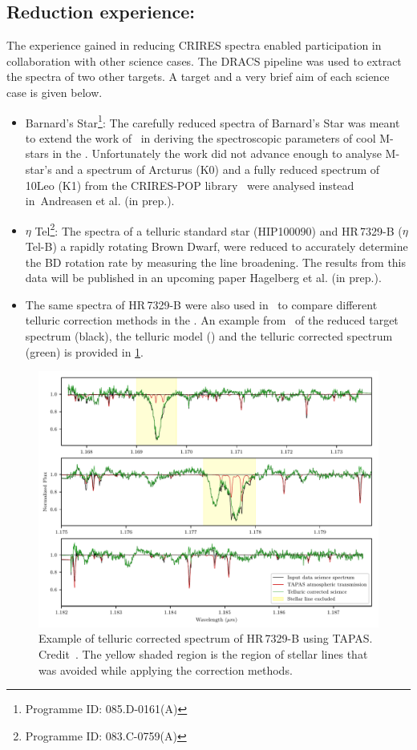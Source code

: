 \subsection{Reduction experience:}
\label{subsec:experience}
The experience gained in reducing {CRIRES} spectra enabled participation in collaboration with other science cases.
The {DRACS} pipeline was used to extract the spectra of two other targets.
A target and a very brief aim of each science case is given below.
\begin{itemize}
\item Barnard's Star\footnote{Programme {{ID}}: 085.D-0161(A)}: The carefully reduced \nir{} spectra of Barnard's Star was meant to extend the work of~\citet{andreasen_nearinfrared_2016} in deriving the spectroscopic parameters of cool M-stars in the \nir{}.
Unfortunately the work did not advance enough to analyse M-star's and a spectrum of {Arcturus} (K0) and a fully reduced spectrum of {10Leo} (K1) from the {CRIRES}-POP library~\cite{nicholls_crirespop_2017} were analysed instead in~{Andreasen et al. (in prep.)}.
\item \(\eta\) Tel\footnote{Programme {{ID}}: 083.C-0759(A)}: The spectra of a telluric standard star (HIP100090) and {HR\,7329-B} (\(\eta\) Tel-B) a rapidly rotating Brown Dwarf, were reduced to accurately determine the BD rotation rate by measuring the line broadening.
The results from this data will be published in an upcoming paper Hagelberg et al. (in prep.).
\item The same spectra of {HR\,7329-B} were also used in~\citet{ulmer-moll_telluric_2018} to compare different telluric correction methods in the \nir{}.
An example from~\citet[][(B.3)]{ulmer-moll_telluric_2018} of the reduced target spectrum (black), the telluric model () and the telluric corrected spectrum (green) is provided in \cref{fig:ulmermol2018tellcorrcrires48}.
\end{itemize}

\begin{figure}
    \centering
    \includegraphics[width=0.7\linewidth]{figures/reduction/ulmermol2018_tell_corr_CRIRES_48}
    \caption{Example of telluric corrected spectrum of {HR\,7329-B} using {TAPAS}.
Credit~\citet[][]{ulmer-moll_telluric_2018}.
The yellow shaded region is the region of stellar lines that was avoided while applying the correction methods.}
    \label{fig:ulmermol2018tellcorrcrires48}
\end{figure}


